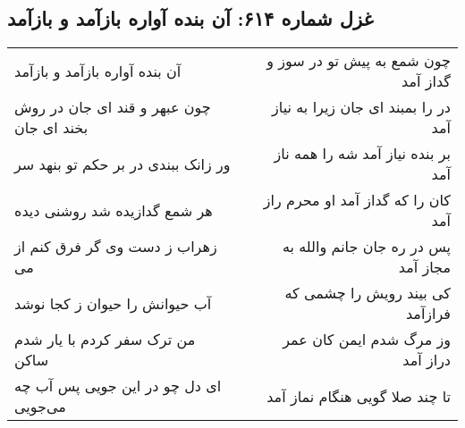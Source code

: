 \begin{center}
\section*{غزل شماره ۶۱۴: آن بنده آواره بازآمد و بازآمد}
\label{sec:0614}
\begin{longtable}{l p{0.5cm} r}
آن بنده آواره بازآمد و بازآمد
&&
چون شمع به پیش تو در سوز و گداز آمد
\\
چون عبهر و قند ای جان در روش بخند ای جان
&&
در را بمبند ای جان زیرا به نیاز آمد
\\
ور زانک ببندی در بر حکم تو بنهد سر
&&
بر بنده نیاز آمد شه را همه ناز آمد
\\
هر شمع گدازیده شد روشنی دیده
&&
کان را که گداز آمد او محرم راز آمد
\\
زهراب ز دست وی گر فرق کنم از می
&&
پس در ره جان جانم والله به مجاز آمد
\\
آب حیوانش را حیوان ز کجا نوشد
&&
کی بیند رویش را چشمی که فرازآمد
\\
من ترک سفر کردم با یار شدم ساکن
&&
وز مرگ شدم ایمن کان عمر دراز آمد
\\
ای دل چو در این جویی پس آب چه می‌جویی
&&
تا چند صلا گویی هنگام نماز آمد
\\
\end{longtable}
\end{center}
